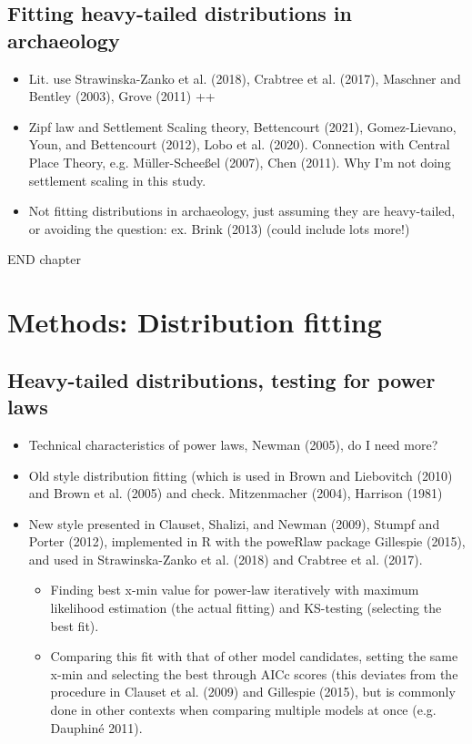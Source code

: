 \documentclass[
  12pt,
]{book}
\begin{document}
\hypertarget{distfit-archaeo}{%
\section{Fitting heavy-tailed distributions in archaeology}\label{distfit-archaeo}}

\begin{itemize}
\item
  Lit. use Strawinska-Zanko et al. (2018), Crabtree et al. (2017), Maschner and Bentley (2003), Grove (2011) ++
\item
  Zipf law and Settlement Scaling theory, Bettencourt (2021), Gomez-Lievano, Youn, and Bettencourt (2012), Lobo et al. (2020). Connection with Central Place Theory, e.g. Müller-Scheeßel (2007), Chen (2011). Why I'm not doing settlement scaling in this study.
\item
  Not fitting distributions in archaeology, just assuming they are heavy-tailed, or avoiding the question: ex. Brink (2013) (could include lots more!)
\end{itemize}

END chapter

\hypertarget{methods-distfit}{%
\chapter{Methods: Distribution fitting}\label{methods-distfit}}

\hypertarget{heavy-tailed-distributions-testing-for-power-laws}{%
\section{Heavy-tailed distributions, testing for power laws}\label{heavy-tailed-distributions-testing-for-power-laws}}

\begin{itemize}
\item
  Technical characteristics of power laws, Newman (2005), do I need more?
\item
  Old style distribution fitting (which is used in Brown and Liebovitch (2010) and Brown et al. (2005) and check. Mitzenmacher (2004), Harrison (1981)
\item
  New style presented in Clauset, Shalizi, and Newman (2009), Stumpf and Porter (2012), implemented in R with the poweRlaw package Gillespie (2015), and used in Strawinska-Zanko et al. (2018) and Crabtree et al. (2017).

  \begin{itemize}
  \item
    Finding best x-min value for power-law iteratively with maximum likelihood estimation (the actual fitting) and KS-testing (selecting the best fit).
  \item
    Comparing this fit with that of other model candidates, setting the same x-min and selecting the best through AICc scores (this deviates from the procedure in Clauset et al. (2009) and Gillespie (2015), but is commonly done in other contexts when comparing multiple models at once (e.g. Dauphiné 2011).
  \end{itemize}
\end{itemize}
\end{document}
